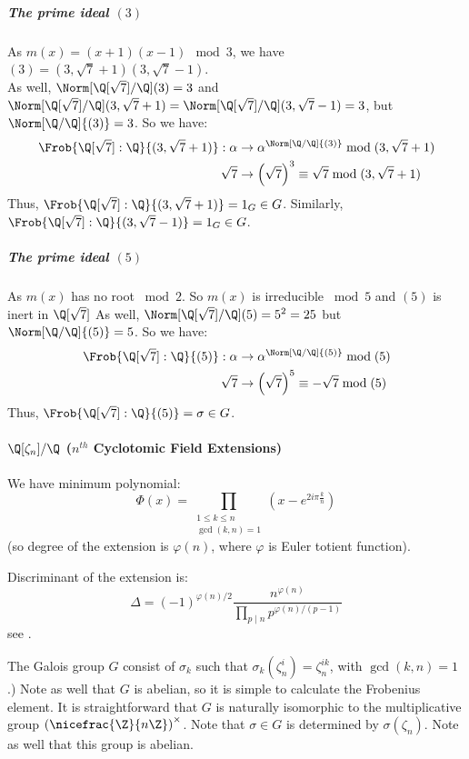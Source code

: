 \subparagraph{The prime ideal $(3)$}
As $m(x) = (x+1)(x-1) \mod 3$, we have $(3) = (3, \sqrt{7}+1)(3, \sqrt{7}-1)$.\\
As well, $\Norm[{\Q[\sqrt{7}]/\Q}]{(3)} = 3$ and $\Norm[{\Q[\sqrt{7}]/\Q}]{(3, \sqrt{7}+1)} 
=\Norm[{\Q[\sqrt{7}]/\Q}]{(3, \sqrt{7}-1)} 
= 3
$, but $\Norm[\Q/\Q]{(3)} = 3$.
So we have:
\begin{align*}
    \Frob{\Q[\sqrt{7}]:\Q}{(3, \sqrt{7}+1)}:
    \alpha   &\to \alpha^{\Norm[\Q/\Q]{(3)}} \bmod (3, \sqrt{7}+1)\\
    \sqrt{7} &\to \left( \sqrt{7} \right)^3 \equiv \sqrt{7} \bmod (3, \sqrt{7}+1)
\end{align*}
Thus, $\Frob{\Q[\sqrt{7}]:\Q}{(3, \sqrt{7}+1)} = 1_G \in G$.
Similarly, $\Frob{\Q[\sqrt{7}]:\Q}{(3, \sqrt{7}-1)} = 1_G \in G$.

\subparagraph{The prime ideal $(5)$}
As $m(x)$ has no root $\bmod 2$. So $m(x)$ is irreducible $\bmod 5$ and $(5)$ is inert in $\Q[\sqrt{7}]$
As well, $\Norm[{\Q[\sqrt{7}]/\Q}]{(5)} = 5^2 = 25$ but $\Norm[\Q/\Q]{(5)} = 5$.
So we have:
\begin{align*}
    \Frob{\Q[\sqrt{7}]:\Q}{(5)}: 
    \alpha   &\to \alpha^{\Norm[\Q/\Q]{(5)}} \bmod (5)\\
    \sqrt{7} &\to \left( \sqrt{7} \right)^5 \equiv -\sqrt{7} \bmod (5)
\end{align*}
Thus, $\Frob{\Q[\sqrt{7}]:\Q}{(5)} = \sigma \in G$.

\paragraph{$\Q[\zeta_n]/\Q$ ($n^{th}$ Cyclotomic Field Extensions)}
We have minimum polynomial:
$$
\Phi(x)= \prod_{\substack{1 \leq k \leq n \\ \gcd(k,n)=1}} 
\left( x-e^{2 i \pi \frac{k}{n}} \right)
$$
(so degree of the extension is $\varphi(n)$, where $\varphi$ is Euler totient function).

Discriminant of the extension is:
$$
\Delta = (-1)^{\varphi(n)/2}
\frac{n^{\varphi(n)}}{\prod_{p \mid n} p^{\varphi(n)/(p-1)}}
$$
see \cite[Proposition 2.7]{IntroductionToCyclotomicFields}.

The Galois group $G$ consist of $\sigma_k$ such that $\sigma_k(\zeta_n^i)=\zeta_n^{ik}$, with $\gcd(k,n)=1$.)
Note as well that $G$ is abelian, so it is simple to calculate the Frobenius element.
It is straightforward that $G$ is naturally isomorphic to the multiplicative group $\left( \nicefrac{\Z}{n\Z} \right)^\times$.
Note that $\sigma \in G$ is determined by $\sigma(\zeta_n)$.
Note as well that this group is abelian.

